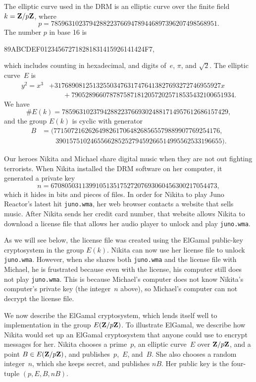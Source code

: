 The elliptic curve used in the DRM is an elliptic curve over the
finite field $k=\mathbf{Z}/p\mathbf{Z}{}$, where
$$
  p=785963102379428822376694789446897396207498568951.
$$
The number $p$ in base 16 is
\begin{center}
89ABCDEF012345672718281831415926141424F7,
\end{center}
which includes counting in hexadecimal, and digits of~$e$,
$\pi$, and $\sqrt{2}$.
The elliptic curve~$E$ is
\begin{align*}
y^2 = x^3 &+ 317689081251325503476317476413827693272746955927x \\
             &\qquad +79052896607878758718120572025718535432100651934.
\end{align*}
We have
$$\# E(k) = 785963102379428822376693024881714957612686157429,$$
and the group $E(k)$ is cyclic with generator
\begin{align*}
B &= (771507216262649826170648268565579889907769254176, \\
&\qquad 390157510246556628525279459266514995562533196655).
\end{align*}

Our heroes Nikita and Michael share
digital music when they are not out fighting terrorists.  When Nikita
installed the DRM software on her computer, it generated a private key
$$
n = 670805031139910513517527207693060456300217054473,
$$
which it hides in bits and pieces of files.  In order for Nikita to
play Juno Reactor's latest hit {\tt juno.wma}, her web browser contacts a
website that sells music.  After Nikita sends her credit card number,
that website allows Nikita to download a license file that allows
her audio player to unlock and play {\tt juno.wma}.

As we will see below, the license file was created using the ElGamal
public-key cryptosystem in the group $E(k)$.
Nikita can now use her license file to unlock {\tt juno.wma}.
However, when she shares both {\tt juno.wma} and the license file with
Michael, he is frustrated because even with the license, his computer
still does not play {\tt juno.wma}.  This is because Michael's computer
does not know Nikita's computer's private key (the integer~$n$ above),
so Michael's computer can not decrypt the license file.

We now describe the ElGamal cryptosystem, which lends itself well to
implementation in the group $E(\mathbf{Z}/p\mathbf{Z}{})$.  To illustrate ElGamal, we
describe how Nikita would set up an ElGamal cryptosystem that anyone
could use to encrypt messages for her.  Nikita chooses a prime~$p$, an
elliptic curve~$E$ over $\mathbf{Z}/p\mathbf{Z}{}$, and a point $B\in E(\mathbf{Z}/p\mathbf{Z}{})$, and
publishes~$p$,~$E$, and~$B$.  She also chooses a random integer~$n$,
which she keeps secret, and publishes $nB$.  Her public key is the
four-tuple $(p,E,B, nB)$.

